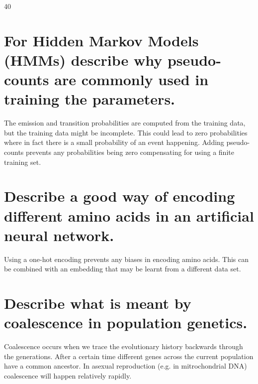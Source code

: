 \documentclass{uosexam2021}    %
\newcommand{\mpos}[1]{}
\newcommand{\lines}[1]{}
\newcommand{\addspc}{}
\begin{document}
\begin{question}{40}
  \begin{parts}\mpos{3cm}
    \part[5]{For Hidden Markov Models (HMMs) describe why
      pseudo-counts are commonly used in training the parameters.}{\lines{6}}
    \begin{answer}
      The emission and transition probabilities are computed from the
      training data, but the training data might be incomplete.  This
      could lead to zero probabilities where in fact there is a small
      probability of an event happening.  Adding pseudo-counts
      prevents any probabilities being zero compensating for using a
      finite training set.
    \end{answer}\mpos{3cm}
    \part[5]{Describe a good way of encoding different amino acids in
      an artificial neural network.}{\lines{6}}
    \begin{answer}
      Using a one-hot encoding prevents any biases in encoding amino
      acids.  This can be combined with an embedding that may be
      learnt from a different data set.
    \end{answer}\mpos{3cm}
    \part[5]{Describe what is meant by coalescence in population
      genetics.}{\lines{6}}
    \begin{answer}
      Coalescence occurs when we trace the evolutionary history
      backwards through the generations.  After a certain time
      different genes across the current population have a common
      ancestor.  In asexual reproduction (e.g. in mitrochondrial DNA)
      coalescence will happen relatively rapidly.
    \end{answer}
    \addspc
    \mpos{3cm}

\end{parts}
\end{question}
\end{document}
